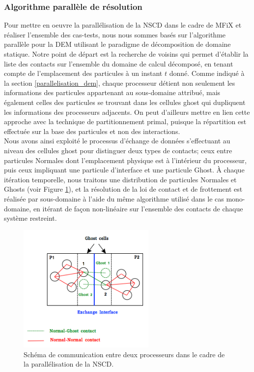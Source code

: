 \subsubsection{Algorithme parallèle de résolution}

Pour mettre en oeuvre la parallélisation de la NSCD dans le cadre de MFiX et réaliser l'ensemble des cas-tests, nous nous sommes basés sur l'algorithme parallèle pour la DEM utilisant le paradigme de décomposition de domaine statique. Notre point de départ est la recherche de voisins qui permet d'établir la liste des contacts sur l'ensemble du domaine de calcul décomposé, en tenant compte de l'emplacement des particules à un instant $t$ donné. Comme indiqué à la section \ref{parallelisation_dem}, chaque processeur détient non seulement les informations des particules appartenant au sous-domaine attribué, mais également celles des particules se trouvant dans les cellules ghost qui dupliquent les informations des processeurs adjacents. On peut d'ailleurs mettre en lien cette approche avec la technique de partitionnement primal, puisque la répartition est effectuée sur la base des particules et non des interactions.\\

Nous avons ainsi exploité le processus d'échange de données s'effectuant au niveau des cellules ghost pour distinguer deux types de contacts; ceux entre particules Normales dont l'emplacement physique est à l'intérieur du processeur, puis ceux impliquant une particule d'interface et une particule Ghost. À chaque itération temporelle, nous traitons une distribution de particules Normales et Ghosts (voir Figure \ref{normal_ghost_scheme}), et la résolution de la loi de contact et de frottement est réalisée par sous-domaine à l’aide du même algorithme utilisé dans le cas mono-domaine, en itérant de façon non-linéaire sur l'ensemble des contacts de chaque système restreint.

\begin{figure}[!h]
  \centering
    \includegraphics[width=0.6\textwidth]{chapitres/chapitre_4/figures/normal_ghost_scheme.png}
    \caption{\centering Schéma de communication entre deux processeurs dans le cadre de la parallélisation de la NSCD.}\label{normal_ghost_scheme}
\end{figure}

